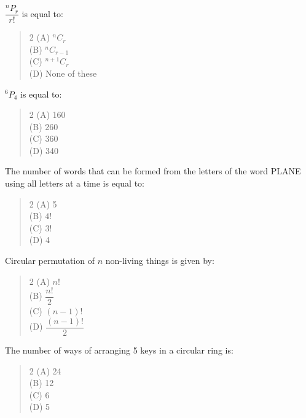 \documentclass[11pt,a4paper]{article}
\begin{document}
\begin{mcqlist}
\item $\dfrac{^nP_r}{r!}$ is equal to:
\begin{quote}\begin{multicols}{2}
\noindent (A) $^nC_r$ \\
(B) $^nC_{r-1}$ \\
(C) $^{n+1}C_r$ \\
(D) None of these
\end{multicols}\end{quote}

\item $^6P_4$ is equal to:
\begin{quote}\begin{multicols}{2}
\noindent (A) 160 \\
(B) 260 \\
(C) 360 \\
(D) 340
\end{multicols}\end{quote}

\item The number of words that can be formed from the letters of the word PLANE using all letters at a time is equal to:
\begin{quote}\begin{multicols}{2}
\noindent (A) 5 \\
(B) $4!$ \\
(C) $3!$ \\
(D) 4
\end{multicols}\end{quote}

\item Circular permutation of $n$ non-living things is given by:
\begin{quote}\begin{multicols}{2}
\noindent (A) $n!$ \\
(B) $\dfrac{n!}{2}$ \\
(C) $(n-1)!$ \\
(D) $\dfrac{(n-1)!}{2}$
\end{multicols}\end{quote}

\item The number of ways of arranging 5 keys in a circular ring is:
\begin{quote}\begin{multicols}{2}
\noindent (A) 24 \\
(B) 12 \\
(C) 6 \\
(D) 5
\end{multicols}\end{quote}


\end{mcqlist}
\end{document}
